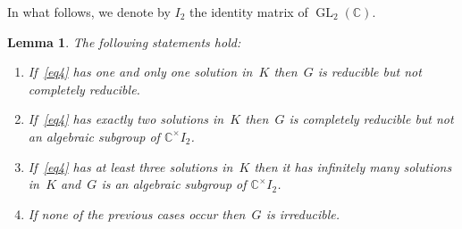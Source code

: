 \documentclass[pdftex]{sigma}
\numberwithin{equation}{section}
\newtheorem{Lemma}[Theorem]{Lemma}
\begin{document}
In what follows, we denote by $I_{2}$ the identity matrix of $\operatorname{GL}_2(\mathbb C)$.

\begin{Lemma}
\label{lem1}
The following statements hold:
\begin{enumerate}\itemsep=0pt
\item[$1.$] If~\eqref{eq4} has one and only one solution in~$K$ then~$G$ is reducible but not completely reducible.
\item[$2.$] If~\eqref{eq4} has exactly two solutions in~$K$ then~$G$ is completely reducible but not an algebraic subgroup of
$\mathbb C^{\times} I_{2}$.
\item[$3.$] If~\eqref{eq4} has at least three solutions in~$K$ then it has infinitely many solutions in~$K$ and~$G$ is an
algebraic subgroup of $\mathbb C^{\times} I_{2}$.
\item[$4.$] If none of the previous cases occur then~$G$ is irreducible.
\end{enumerate}
\end{Lemma}
\end{document}

